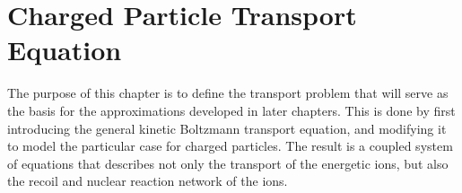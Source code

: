 \documentclass[../main.tex]{subfiles}
\begin{document}
\chapter{Charged Particle Transport Equation}
The purpose of this chapter is to define the transport problem that will serve as the basis for the approximations developed in later chapters. This is done by first introducing the general kinetic Boltzmann transport equation, and modifying it to model the particular case for charged particles. The result is a coupled system of equations that describes not only the transport of the energetic ions, but also the recoil and nuclear reaction network of the ions.






\end{document}
